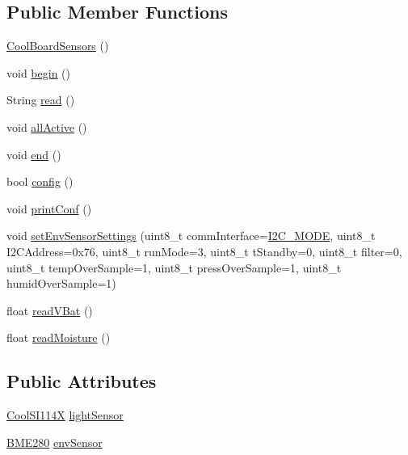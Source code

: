 \subsection*{Public Member Functions}
\begin{DoxyCompactItemize}
\item 
\hyperlink{class_cool_board_sensors_a91ff2a02f5486f90cf2413a1cf8a9ed4}{Cool\+Board\+Sensors} ()
\item 
void \hyperlink{class_cool_board_sensors_a97095823ef7c8f5290812f1405b966b3}{begin} ()
\item 
String \hyperlink{class_cool_board_sensors_a91badb2539d91fda8679f2a597874c48}{read} ()
\item 
void \hyperlink{class_cool_board_sensors_aa432c5aac88f89c31a10766390f23e0b}{all\+Active} ()
\item 
void \hyperlink{class_cool_board_sensors_a4902b69f6e628bd6557193758fdd2bae}{end} ()
\item 
bool \hyperlink{class_cool_board_sensors_a9a218895c5423375c33c08f2c56fb23a}{config} ()
\item 
void \hyperlink{class_cool_board_sensors_af6fd79505815b204c178617ecf54c873}{print\+Conf} ()
\item 
void \hyperlink{class_cool_board_sensors_a406307ffd70272282d91479c7ed8d66f}{set\+Env\+Sensor\+Settings} (uint8\+\_\+t comm\+Interface=\hyperlink{_cool_spark_fun_b_m_e280_8h_a5cd01756030509b764d43a2b8c94fce8}{I2\+C\+\_\+\+M\+O\+DE}, uint8\+\_\+t I2\+C\+Address=0x76, uint8\+\_\+t run\+Mode=3, uint8\+\_\+t t\+Standby=0, uint8\+\_\+t filter=0, uint8\+\_\+t temp\+Over\+Sample=1, uint8\+\_\+t press\+Over\+Sample=1, uint8\+\_\+t humid\+Over\+Sample=1)
\item 
float \hyperlink{class_cool_board_sensors_a6944b6ea7bce8e2fce1b434acfd9d5f3}{read\+V\+Bat} ()
\item 
float \hyperlink{class_cool_board_sensors_a8761bff50373c485f4465c8db47d0633}{read\+Moisture} ()
\end{DoxyCompactItemize}
\subsection*{Public Attributes}
\begin{DoxyCompactItemize}
\item 
\hyperlink{class_cool_s_i114_x}{Cool\+S\+I114X} \hyperlink{class_cool_board_sensors_ac711c27d0927eb5e73be77f092c48be0}{light\+Sensor}
\item 
\hyperlink{class_b_m_e280}{B\+M\+E280} \hyperlink{class_cool_board_sensors_a868e38985e9a2412829fa2790ca13e2e}{env\+Sensor}
\end{DoxyCompactItemize}
